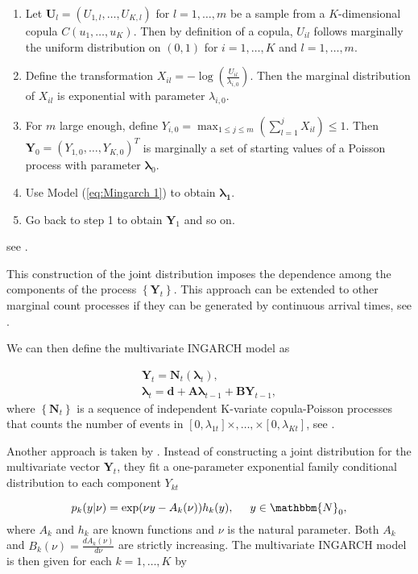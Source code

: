 \begin{enumerate}
	\item Let $\bm{U}_l=(U_{1,l},\ldots,U_{K,l})$ for $l=1,\ldots,m$ be a sample from a $K$-dimensional copula $C(u_1,\ldots,u_K)$. Then by definition of a copula, $U_{il}$ follows marginally the uniform distribution on $(0,1)$ for $i=1,\ldots,K$ and $l=1,\ldots,m$. 
	\item Define the transformation $X_{il} = -\log (\frac{U_{il}}{\lambda_{i,0}})$. Then the marginal distribution of $X_{il}$ is exponential with parameter $\lambda_{i,0}$. 
	\item For $m$ large enough, define $Y_{i,0} = \max_{1\leq j \leq m}(\sum_{l=1}^j X_{il})\leq 1$. Then $\bm{Y}_0=(Y_{1,0},\ldots,Y_{K,0})^T$ is marginally a set of starting values of a Poisson process with parameter $\bm{\lambda}_0$. 
	\item Use Model (\ref{eq:Mingarch 1}) to obtain $\bm{\lambda_1}$.
	\item Go back to step 1 to obtain $\bm{Y}_1$ and so on. 
\end{enumerate}
%
see \textcite{Fokianos:2020}.

This construction of the joint distribution imposes the dependence among the components of the process $\left\{\bm{Y}_t\right\}$. This approach can be extended to other marginal count processes if they can be generated by continuous arrival times, see \textcite{Fokianos:2020}. 

We can then define the multivariate INGARCH model as

\begin{equation}
\begin{gathered}
\bm{Y}_t = \bm{N}_t(\bm{\lambda}_t), \\
\bm{\lambda}_t = \bm{d} + \bm{A}\bm{\lambda}_{t-1} + \bm{B}\bm{Y}_{t-1},
\label{eq:Mingarch 1 new}
\end{gathered}
\end{equation}
%
where $\left\{\bm{N}_t\right\}$ is a sequence of independent K-variate copula-Poisson processes that counts the number of events in $[0,\lambda_{1t}]\times,\ldots,\times[0,\lambda_{Kt}]$, see \textcite{Fokianos:2020}. 

Another approach is taken by \textcite{Lee:2023}. Instead of constructing a joint distribution for the multivariate vector $\bm{Y}_t$, they fit a one-parameter exponential family conditional distribution to each component $Y_{kt}$

\begin{equation}
p_{k}(y|\nu) = \exp(\nu y - A_k(\nu))h_k(y), \hspace{0.5cm} y \in \mathbbm{N}_0,
\label{eq:Exponential Family}
\end{equation}
where $A_k$ and $h_k$ are known functions and $\nu$ is the natural parameter. Both $A_k$ and $B_k(\nu) = \frac{d A_k(\nu)}{d \nu}$ are strictly increasing. The multivariate INGARCH model is then given for each $k=1,\ldots,K$ by

